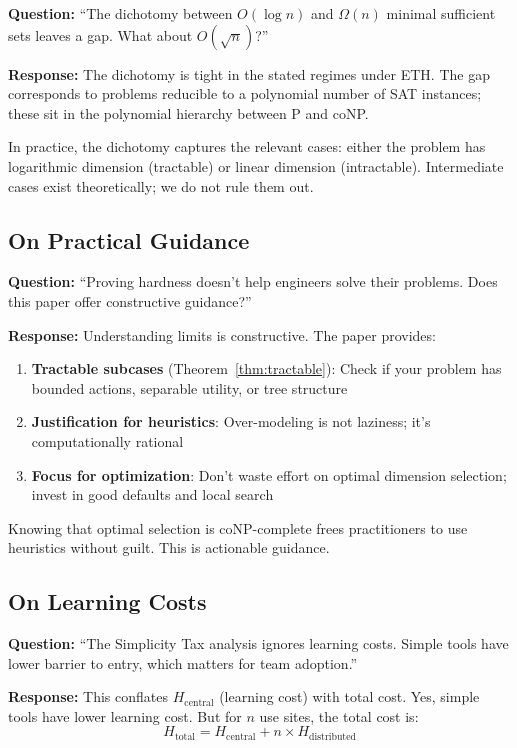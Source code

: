 \textbf{Question:} ``The dichotomy between $O(\log n)$ and $\Omega(n)$ minimal sufficient sets leaves a gap. What about $O(\sqrt{n})$?''

\textbf{Response:} The dichotomy is tight in the stated regimes under ETH. The gap corresponds to problems reducible to a polynomial number of SAT instances; these sit in the polynomial hierarchy between P and coNP.

In practice, the dichotomy captures the relevant cases: either the problem has logarithmic dimension (tractable) or linear dimension (intractable). Intermediate cases exist theoretically; we do not rule them out.

\subsection{On Practical Guidance}

\textbf{Question:} ``Proving hardness doesn't help engineers solve their problems. Does this paper offer constructive guidance?''

\textbf{Response:} Understanding limits is constructive. The paper provides:

\begin{enumerate}
\item \textbf{Tractable subcases} (Theorem~\ref{thm:tractable}): Check if your problem has bounded actions, separable utility, or tree structure
\item \textbf{Justification for heuristics}: Over-modeling is not laziness; it's computationally rational
\item \textbf{Focus for optimization}: Don't waste effort on optimal dimension selection; invest in good defaults and local search
\end{enumerate}

Knowing that optimal selection is coNP-complete frees practitioners to use heuristics without guilt. This is actionable guidance.

\subsection{On Learning Costs}

\textbf{Question:} ``The Simplicity Tax analysis ignores learning costs. Simple tools have lower barrier to entry, which matters for team adoption.''

\textbf{Response:} This conflates $H_{\text{central}}$ (learning cost) with total cost. Yes, simple tools have lower learning cost. But for $n$ use sites, the total cost is:
\[H_{\text{total}} = H_{\text{central}} + n \times H_{\text{distributed}}\]

